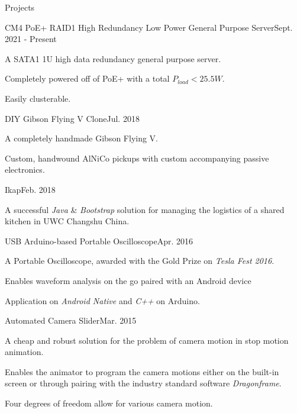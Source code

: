 \documentclass{resume}
\begin{document}
\begin{rSection}{Projects}
    \begin{rSubsection}{CM4 PoE+ RAID1 High Redundancy Low Power General
        Purpose Server}{Sept. 2021 - Present}{}{}
        \item A SATA1 1U high data redundancy general purpose server.
        \item Completely powered off of PoE+ with a total $P_{load} <
            25.5\si{W}$.
        \item Easily clusterable.
    \end{rSubsection}

    \begin{rSubsection}{DIY Gibson Flying V Clone}{Jul. 2018}{}{}
        \item A completely handmade Gibson Flying V.
        \item Custom, handwound AlNiCo pickups with custom accompanying passive
            electronics.
    \end{rSubsection}

    \begin{rSubsection}{Ikap}{Feb. 2018}{}{}
    \item A successful \textit{Java} \& \textit{Bootstrap} solution for
            managing the logistics of a shared kitchen in UWC Changshu China.
    \end{rSubsection}

    \begin{rSubsection}{USB Arduino-based Portable Oscilloscope}{Apr. 2016}{}{}
        \item A Portable Oscilloscope, awarded with the Gold Prize on
            \textit{Tesla Fest 2016}.
        \item Enables waveform analysis on the go paired with an Android device
        \item Application on \textit{Android Native} and \textit{C++} on
            Arduino.
    \end{rSubsection}

    \begin{rSubsection}{Automated Camera Slider}{Mar. 2015}{}{}
        \item A cheap and robust solution for the problem of camera motion in
            stop motion animation.
        \item Enables the animator to program the camera motions either on the
            built-in screen or through pairing with the industry standard
            software \textit{Dragonframe}.
        \item Four degrees of freedom allow for various camera motion.
    \end{rSubsection}
\end{rSection}
\end{document}
